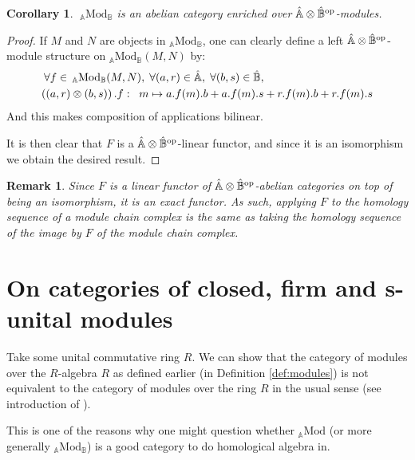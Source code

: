 \documentclass[a4paper,fleqn]{cas-sc}
\newtheorem{cor}[thm]{Corollary}
\newtheorem{rem}{Remark}%
\newcommand{\bA}{\mathbb{A}}
\newcommand{\bB}{\mathbb{B}}
\newcommand{\qmod}{\mathrm{Mod}}
\begin{document}
\begin{cor}
$\;_\bA\qmod_\bB$ is an abelian category enriched over $\Hat{\bA} \otimes \Hat{\bB}^{\text{op}}$-modules.
\end{cor}

\begin{proof}
If $M$ and $N$ are objects in $_\bA\qmod_\bB $, one can clearly define a left $\Hat{\bA} \otimes \Hat{\bB}^{\text{op}} $-module structure on $_\bA\qmod_\bB (M,N)$ by:
\begin{align*}
\forall f \in \,_\bA\qmod_\bB (M,N), \;
\forall (a,r) \in \Hat{\bA}, \;
\forall (b,s) \in \Hat{\bB},& \\
\left((a,r) \otimes (b,s) \right).f : \; \; m \mapsto 
a.f(m).b + a.f(m).s &+ r.f(m).b + r.f(m).s
\end{align*}
And this makes composition of applications bilinear. 

It is then clear that $F$ is a $\Hat{\bA} \otimes \Hat{\bB}^{\text{op}} $-linear functor, and since it is an isomorphism we obtain the desired result.
\end{proof}

\begin{rem}
Since $F$ is a linear functor of $\Hat{\bA} \otimes \Hat{\bB}^{\text{op}}$-abelian categories on top of being an isomorphism, it is an exact functor. As such, applying $F$ to the homology sequence of a module chain complex is the same as taking the homology sequence of the image by $F$ of the module chain complex. 
\end{rem}


\section{On categories of closed, firm and s-unital modules}

\label{sec:categories}

Take some unital commutative ring $R$. We can show that the category of modules over the $R$-algebra $R$ as defined earlier (in Definition \ref{def:modules}) is not equivalent to the category of modules over the ring $R$ in the usual sense (see introduction of \cite{quillen}).  

This is one of the reasons why one might question whether $_\bA\qmod$ (or more generally $_\bA\qmod _\bB$) is a good category to do homological algebra in.
\end{document}
